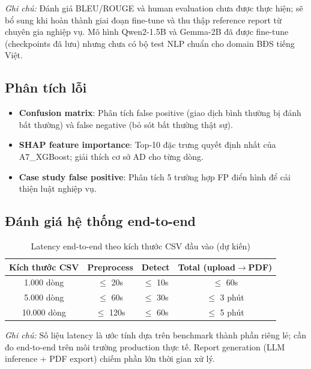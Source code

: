 \textit{Ghi chú:} Đánh giá BLEU/ROUGE và human evaluation chưa được thực hiện; sẽ bổ sung khi hoàn thành giai đoạn fine-tune và thu thập reference report từ chuyên gia nghiệp vụ. Mô hình Qwen2-1.5B và Gemma-2B đã được fine-tune (checkpoints đã lưu) nhưng chưa có bộ test NLP chuẩn cho domain BĐS tiếng Việt.

\subsection{Phân tích lỗi}

\begin{itemize}
  \item \textbf{Confusion matrix}: Phân tích false positive (giao dịch bình thường bị đánh bất thường) và false negative (bỏ sót bất thường thật sự).
  \item \textbf{SHAP feature importance}: Top-10 đặc trưng quyết định nhất của A7\_XGBoost; giải thích cơ sở AD cho từng dòng.
  \item \textbf{Case study false positive}: Phân tích 5 trường hợp FP điển hình để cải thiện luật nghiệp vụ.
\end{itemize}

\subsection{Đánh giá hệ thống end-to-end}

\begin{table}[h!]
\centering
\fontsize{13pt}{14.95pt}\selectfont
\caption{Latency end-to-end theo kích thước CSV đầu vào (dự kiến)}
\label{tab:latency}
\begin{tabularx}{\textwidth}{|c|c|c|c|}
\hline
\textbf{Kích thước CSV} & \textbf{Preprocess} & \textbf{Detect} & \textbf{Total (upload$\to$PDF)} \\
\hline
1.000 dòng & $\leq$ 20s & $\leq$ 10s & $\leq$ 60s \\
\hline
5.000 dòng & $\leq$ 60s & $\leq$ 30s & $\leq$ 3 phút \\
\hline
10.000 dòng & $\leq$ 120s & $\leq$ 60s & $\leq$ 5 phút \\
\hline
\end{tabularx}
\end{table}

\textit{Ghi chú:} Số liệu latency là ước tính dựa trên benchmark thành phần riêng lẻ; cần đo end-to-end trên môi trường production thực tế. Report generation (LLM inference + PDF export) chiếm phần lớn thời gian xử lý.

